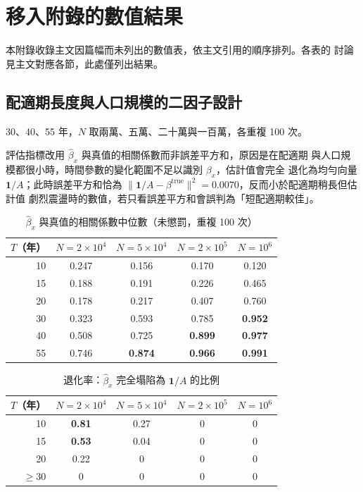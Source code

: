 \documentclass[UTF8, fontset=macnew, a4paper, 12pt]{ctexart}
\begin{document}
\vspace{10pt}
\section{移入附錄的數值結果}\label{sec:appmoved}

本附錄收錄主文因篇幅而未列出的數值表，依主文引用的順序排列。各表的
討論見主文對應各節，此處僅列出結果。

\subsection{配適期長度與人口規模的二因子設計}\label{sec:TN}

30、40、55 年，$N$ 取兩萬、五萬、二十萬與一百萬，各重複 100 次。

評估指標改用 $\hat\beta_x$ 與真值的相關係數而非誤差平方和，原因是在配適期
與人口規模都很小時，時間參數的變化範圍不足以識別 $\beta_x$，估計值會完全
退化為均勻向量 $\mathbf{1}/A$；此時誤差平方和恰為
$\|\mathbf{1}/A-\beta^{\text{true}}\|^2=0.0070$，反而小於配適期稍長但估計值
劇烈震盪時的數值，若只看誤差平方和會誤判為「短配適期較佳」。

\begin{table}[H]
\centering
\caption{$\hat\beta_x$ 與真值的相關係數中位數（未懲罰，重複 100 次）}
\small
\begin{tabular}{rcccc}
\toprule
$T$（年） & $N=2\times10^4$ & $N=5\times10^4$ & $N=2\times10^5$ & $N=10^6$\\
\midrule
10 & 0.247 & 0.156 & 0.170 & 0.120\\
15 & 0.188 & 0.191 & 0.226 & 0.465\\
20 & 0.178 & 0.217 & 0.407 & 0.760\\
30 & 0.323 & 0.593 & 0.785 & \textbf{0.952}\\
40 & 0.508 & 0.725 & \textbf{0.899} & \textbf{0.977}\\
55 & 0.746 & \textbf{0.874} & \textbf{0.966} & \textbf{0.991}\\
\bottomrule
\end{tabular}
\label{tab:TNcor}
\end{table}
\begin{table}[H]
\centering
\caption{退化率：$\hat\beta_x$ 完全塌陷為 $\mathbf{1}/A$ 的比例}
\small
\begin{tabular}{rcccc}
\toprule
$T$（年） & $N=2\times10^4$ & $N=5\times10^4$ & $N=2\times10^5$ & $N=10^6$\\
\midrule
10 & \textbf{0.81} & 0.27 & 0 & 0\\
15 & \textbf{0.53} & 0.04 & 0 & 0\\
20 & 0.22 & 0 & 0 & 0\\
$\ge30$ & 0 & 0 & 0 & 0\\
\bottomrule
\end{tabular}
\label{tab:TNdegen}
\end{table}
\end{document}
